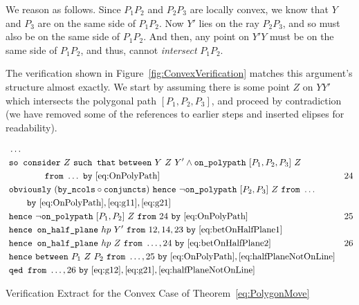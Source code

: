 We reason as follows. Since $P_1P_2$ and $P_2P_3$ are locally convex, we know that $Y$ and $P_3$ are on the same side of $P_1P_2$. Now $Y'$ lies on the ray $P_2P_3$, and so must also be on the same side of $P_1P_2$. And then, any point on $Y'Y$ must be on the same side of $P_1P_2$, and thus, cannot \emph{intersect} $P_1P_2$.

The verification shown in Figure~\ref{fig:ConvexVerification} matches this argument's structure almost exactly.  We start by assuming there is some point $Z$ on $YY'$ which intersects the polygonal path $[P_1,P_2,P_3]$, and proceed by contradiction (we have removed some of the references to earlier steps and inserted elipses for readability). 

\begin{boxedfigure}
\small
\begin{align*}
&\ldots\\
&\code{so consider}\ Z\ \code{such that}\ \between{Y}{Z}{Y'} \wedge \code{on\_polypath}\ [P_1,P_2,P_3]\ Z\\\
&\qquad\qquad\code{from}\ \ldots\ \code{by}\ \eqref{eq:OnPolyPath} & 24\\
&\code{obviously}\ (\code{by\_ncols}\circ\code{conjuncts})\ \code{hence}\ \neg\code{on\_polypath}\ [P_2,P_3]\ Z\ \code{from}\ \ldots\\
&\qquad\code{by}\ \eqref{eq:OnPolyPath},\eqref{eq:g11},\eqref{eq:g21}\\
&\code{hence}\ \neg\code{on\_polypath}\ [P_1,P_2]\ Z\ \code{from}\ 24\ \code{by}\ \eqref{eq:OnPolyPath}&25\\
&\code{hence on\_half\_plane}\ hp\ Y'\ \code{from}\ 12,14,23\ \code{by}\ \eqref{eq:betOnHalfPlane1}\\
&\code{hence on\_half\_plane}\ hp\ Z\ \code{from}\ \ldots,24\ \code{by}\ \eqref{eq:betOnHalfPlane2} & 26\\
&\code{hence}\ \between{P_1}{Z}{P_2}\ \code{from}\ \ldots,25\ \code{by}\ \eqref{eq:OnPolyPath},\eqref{eq:halfPlaneNotOnLine}\\
&\code{qed from}\ \ldots,26\ \code{by}\ \eqref{eq:g12},\eqref{eq:g21},\eqref{eq:halfPlaneNotOnLine}
\end{align*}
\caption{Verification Extract for the Convex Case of Theorem~\ref{eq:PolygonMove}}
\label{fig:ConvexVerification}
\end{boxedfigure}

